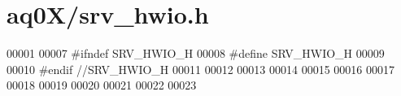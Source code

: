 \hypertarget{a00057_source}{\section{aq0\+X/srv\+\_\+hwio.h}
\label{a00057_source}
}

\begin{DoxyCode}
00001 
00007 \textcolor{preprocessor}{#ifndef SRV\_HWIO\_H}
00008 \textcolor{preprocessor}{#define SRV\_HWIO\_H}
00009 
00010 \textcolor{preprocessor}{#endif  //SRV\_HWIO\_H}
00011 
00012 
00013 
00014 
00015 
00016 
00017 
00018 
00019 
00020 
00021 
00022 
00023 
\end{DoxyCode}
